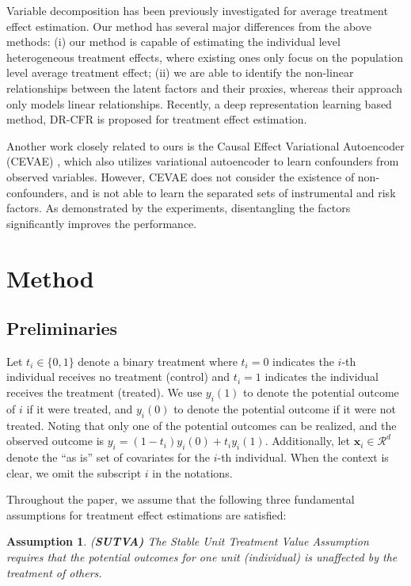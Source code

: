 \documentclass[letterpaper]{article} %
\begin{document}
Variable decomposition \cite{Kun2017,Haeggstroem2017} has been previously investigated for average treatment effect estimation.
Our method has several major differences from the above methods: (i) our method is capable of estimating the individual level heterogeneous treatment effects, where existing ones only focus on the population level average treatment effect; (ii) we are able to identify the non-linear relationships between the latent factors and their proxies, whereas their approach only models linear relationships. Recently, a deep representation learning based method, DR-CFR \cite{Hassanpour2020} is proposed for treatment effect estimation.

Another work closely related to ours is the Causal Effect Variational Autoencoder (CEVAE) \cite{Louizos2017}, which also utilizes variational autoencoder to learn confounders from observed variables. However, CEVAE does not consider the existence of non-confounders, and is not able to learn the separated sets of instrumental and risk factors.
As demonstrated by the experiments, disentangling the factors significantly improves the performance.



\section*{Method}

\subsection*{Preliminaries}
Let $t_i \in \{0,1\}$ denote a binary treatment where $t_i = 0$ indicates the $i$-th individual receives no treatment (control) and $t_i = 1$ indicates the individual receives the treatment (treated). We use $y_i(1)$ to denote the potential outcome of $i$ if it were treated, and $y_i(0)$ to denote the potential outcome if it were not treated. Noting that only one of the potential outcomes can be realized, and the observed outcome is $y_i = (1-t_i)y_i(0) + t_i y_i(1)$. Additionally, let $\mathbf{x}_i \in \mathcal{R}^d$ denote the ``as is'' set of covariates for the $i$-th individual. When the context is clear, we omit the subscript $i$ in the notations.

Throughout the paper, we assume that the following three fundamental assumptions for treatment effect estimations \cite{Rosenbaum1983} are satisfied:
\newtheorem{assumption}{Assumption}
\begin{assumption}
	(\textbf{SUTVA)} The Stable Unit Treatment Value Assumption requires that the potential outcomes for one unit (individual) is unaffected by the treatment of others.
\end{assumption}
\end{document}
